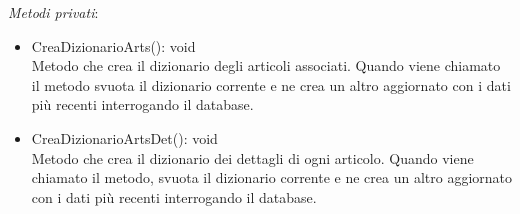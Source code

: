 \textit{Metodi privati}:\\
\begin{itemize}
    \item CreaDizionarioArts(): void \\
    Metodo che crea il dizionario degli articoli associati. Quando viene chiamato il metodo svuota il dizionario corrente e ne crea un altro aggiornato con i dati più recenti 
    interrogando il database.
    \item CreaDizionarioArtsDet(): void \\
    Metodo che crea il dizionario dei dettagli di ogni articolo. Quando viene chiamato il metodo, svuota il dizionario corrente e ne crea un altro aggiornato con i dati più recenti 
    interrogando il database.
\end{itemize} 

